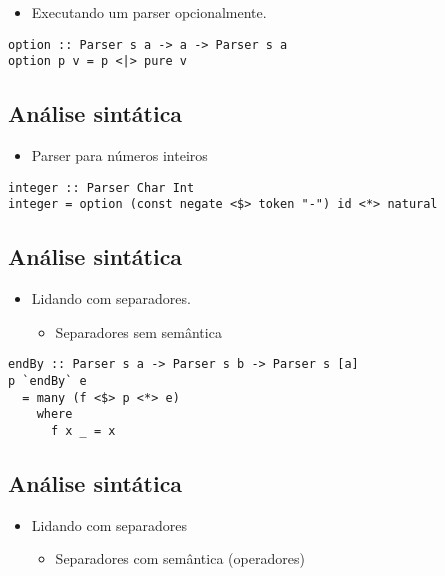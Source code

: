 \documentclass[11pt]{article}
\begin{document}
\begin{itemize}
\item Executando um parser opcionalmente.
\end{itemize}

\begin{verbatim}
option :: Parser s a -> a -> Parser s a 
option p v = p <|> pure v 
\end{verbatim}
\subsection*{Análise sintática}
\label{sec:org80907ba}

\begin{itemize}
\item Parser para números inteiros
\end{itemize}

\begin{verbatim}
integer :: Parser Char Int 
integer = option (const negate <$> token "-") id <*> natural
\end{verbatim}
\subsection*{Análise sintática}
\label{sec:orged4dcfe}

\begin{itemize}
\item Lidando com separadores. 
\begin{itemize}
\item Separadores sem semântica
\end{itemize}
\end{itemize}

\begin{verbatim}
endBy :: Parser s a -> Parser s b -> Parser s [a]
p `endBy` e 
  = many (f <$> p <*> e) 
    where 
      f x _ = x 
\end{verbatim}
\subsection*{Análise sintática}
\label{sec:org4857307}

\begin{itemize}
\item Lidando com separadores 
\begin{itemize}
\item Separadores com semântica (operadores)
\end{itemize}
\end{itemize}
\end{document}
